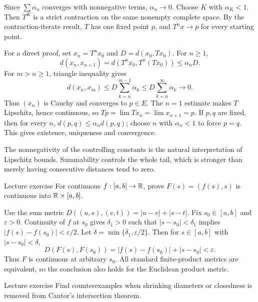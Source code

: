 \begin{answer}
Since $\sum\alpha_n$ converges with nonnegative terms, $\alpha_n\to0$. Choose $K$ with $\alpha_K<1$. Then $T^K$ is a strict contraction on the same nonempty complete space. By the contraction-iterate result, $T$ has one fixed point $p$, and $T^nx\to p$ for every starting point.

For a direct proof, set $x_n=T^nx_0$ and $D=d(x_0,Tx_0)$. For $n\ge1$,
\[d(x_n,x_{n+1})=d(T^nx_0,T^n(Tx_0))\le\alpha_nD.\]
For $m>n\ge1$, triangle inequality gives
\[d(x_n,x_m)\le D\sum_{k=n}^{m-1}\alpha_k\le D\sum_{k=n}^\infty\alpha_k\to0.\]
Thus $(x_n)$ is Cauchy and converges to $p\in E$. The $n=1$ estimate makes $T$ Lipschitz, hence continuous, so $Tp=\lim Tx_n=\lim x_{n+1}=p$. If $p,q$ are fixed, then for every $n$, $d(p,q)\le\alpha_nd(p,q)$; choose $n$ with $\alpha_n<1$ to force $p=q$. This gives existence, uniqueness and convergence.
\end{answer}
\begin{tip}
The nonnegativity of the controlling constants is the natural interpretation of Lipschitz bounds. Summability controls the whole tail, which is stronger than merely having consecutive distances tend to zero.
\end{tip}
\begin{exam}{Lecture exercise}
For continuous $f:[a,b]\to\mathbb R$, prove $F(s)=(f(s),s)$ is continuous into $\mathbb R\times[a,b]$.
\end{exam}
\begin{answer}
Use the sum metric $D((u,s),(v,t))=|u-v|+|s-t|$. Fix $s_0\in[a,b]$ and $\varepsilon>0$. Continuity of $f$ at $s_0$ gives $\delta_1>0$ such that $|s-s_0|<\delta_1$ implies $|f(s)-f(s_0)|<\varepsilon/2$. Let $\delta=\min\{\delta_1,\varepsilon/2\}$. Then for $s\in[a,b]$ with $|s-s_0|<\delta$,
\[D(F(s),F(s_0))=|f(s)-f(s_0)|+|s-s_0|<\varepsilon.\]
Thus $F$ is continuous at arbitrary $s_0$. All standard finite-product metrics are equivalent, so the conclusion also holds for the Euclidean product metric.
\end{answer}
\begin{exam}{Lecture exercise}
Find counterexamples when shrinking diameters or closedness is removed from Cantor's intersection theorem.
\end{exam}
